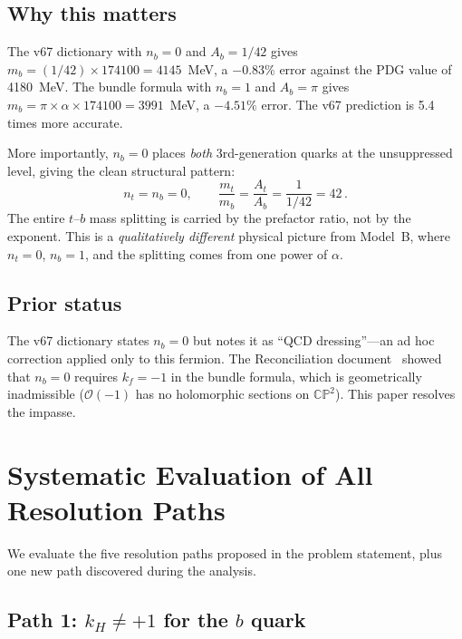 \documentclass[11pt,a4paper]{article}
\newcommand{\CP}{\mathbb{CP}}
\theoremstyle{definition}
\theoremstyle{remark}
\begin{document}
\subsection{Why this matters}

The v67 dictionary with $n_b = 0$ and $A_b = 1/42$ gives
$m_b = (1/42)\times 174100 = 4145$~MeV, a $-0.83\%$ error against the
PDG value of 4180~MeV.  The bundle formula with $n_b = 1$ and $A_b = \pi$
gives $m_b = \pi \times \alpha \times 174100 = 3991$~MeV, a $-4.51\%$ error.
The v67 prediction is 5.4 times more accurate.

More importantly, $n_b = 0$ places \emph{both} 3rd-generation quarks at
the unsuppressed level, giving the clean structural pattern:
\begin{equation}
n_t = n_b = 0, \qquad \frac{m_t}{m_b} = \frac{A_t}{A_b} = \frac{1}{1/42} = 42\,.
\end{equation}
The entire $t$--$b$ mass splitting is carried by the prefactor ratio,
not by the exponent.  This is a \emph{qualitatively different} physical picture
from Model~B, where $n_t = 0$, $n_b = 1$, and the splitting comes from
one power of $\alpha$.

\subsection{Prior status}

The v67 dictionary states $n_b = 0$ but notes it as ``QCD dressing''---an
ad hoc correction applied only to this fermion.  The
Reconciliation document~\cite{Reconciliation} showed that $n_b = 0$
requires $k_f = -1$ in the bundle formula, which is geometrically
inadmissible ($\mathcal{O}(-1)$ has no holomorphic sections on $\CP^2$).
This paper resolves the impasse.

\section{Systematic Evaluation of All Resolution Paths}
\label{sec:paths}

We evaluate the five resolution paths proposed in the problem statement,
plus one new path discovered during the analysis.

\subsection{Path 1: $k_H \neq +1$ for the $b$ quark}
\label{sec:path1}
\end{document}

